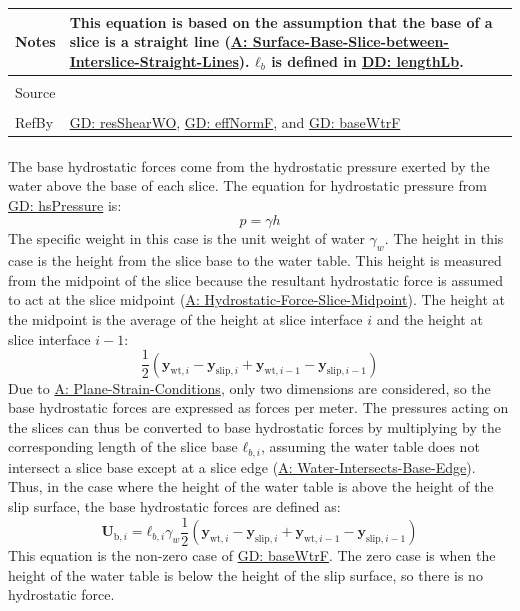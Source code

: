 \documentclass[12pt]{article}
\begin{document}
\begin{minipage}{\textwidth}
\begin{tabular}{>{\raggedright}p{}>{\raggedright\arraybackslash}p{}}
Notes & This equation is based on the assumption that the base of a slice is a straight line (\hyperref[assumpSBSBISL]{A: Surface-Base-Slice-between-Interslice-Straight-Lines}). ${\mathbf{ℓ}_{b}}$ is defined in \hyperref[DD:lengthLb]{DD: lengthLb}.
\\ \midrule \\
Source & \cite{fredlund1977}
\\ \midrule \\
RefBy & \hyperref[GD:resShearWO]{GD: resShearWO}, \hyperref[GD:effNormF]{GD: effNormF}, and \hyperref[GD:baseWtrF]{GD: baseWtrF}
\\ \bottomrule
\end{tabular}
\end{minipage}
\paragraph{}
\label{GD:baseWtrFDeriv}
The base hydrostatic forces come from the hydrostatic pressure exerted by the water above the base of each slice. The equation for hydrostatic pressure from \hyperref[GD:hsPressure]{GD: hsPressure} is:
\begin{displaymath}
p=γ h
\end{displaymath}
The specific weight in this case is the unit weight of water ${γ_{w}}$. The height in this case is the height from the slice base to the water table. This height is measured from the midpoint of the slice because the resultant hydrostatic force is assumed to act at the slice midpoint (\hyperref[assumpHFSM]{A: Hydrostatic-Force-Slice-Midpoint}). The height at the midpoint is the average of the height at slice interface $i$ and the height at slice interface $i-1$:
\begin{displaymath}
\frac{1}{2} \left({\mathbf{y}_{\text{wt},i}}-{\mathbf{y}_{\text{slip},i}}+{\mathbf{y}_{\text{wt},i-1}}-{\mathbf{y}_{\text{slip},i-1}}\right)
\end{displaymath}
Due to \hyperref[assumpPSC]{A: Plane-Strain-Conditions}, only two dimensions are considered, so the base hydrostatic forces are expressed as forces per meter. The pressures acting on the slices can thus be converted to base hydrostatic forces by multiplying by the corresponding length of the slice base ${\mathbf{ℓ}_{b,i}}$, assuming the water table does not intersect a slice base except at a slice edge (\hyperref[assumpWIBE]{A: Water-Intersects-Base-Edge}). Thus, in the case where the height of the water table is above the height of the slip surface, the base hydrostatic forces are defined as:
\begin{displaymath}
{\mathbf{U}_{\text{b},i}}={\mathbf{ℓ}_{b,i}} {γ_{w}} \frac{1}{2} \left({\mathbf{y}_{\text{wt},i}}-{\mathbf{y}_{\text{slip},i}}+{\mathbf{y}_{\text{wt},i-1}}-{\mathbf{y}_{\text{slip},i-1}}\right)
\end{displaymath}
This equation is the non-zero case of \hyperref[GD:baseWtrF]{GD: baseWtrF}. The zero case is when the height of the water table is below the height of the slip surface, so there is no hydrostatic force.
\par~
\end{document}
